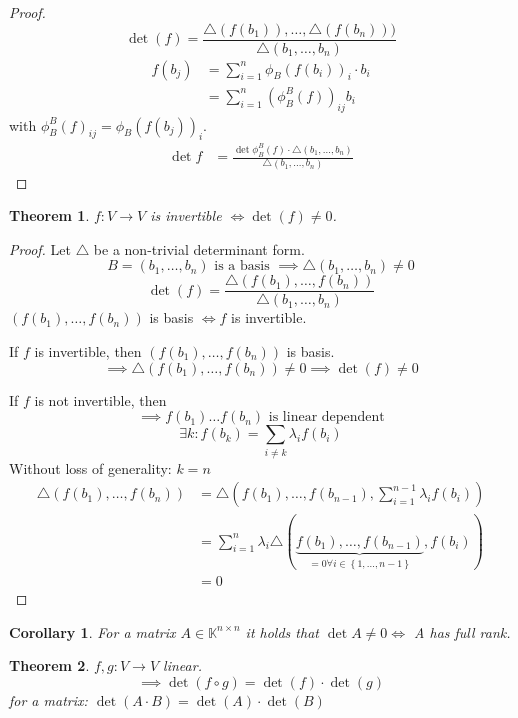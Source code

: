 \documentclass{article}
\newtheorem{theorem}{Theorem}  \numberwithin{theorem}{section}
\newtheorem*{corollary}{Corollary}%
\newcommand{\set}[1]{\left\{#1\right\}}
\begin{document}
\begin{proof}
  \[ \det(f) = \frac{\triangle(f(b_1)), \dots, \triangle(f(b_n)))}{\triangle (b_1, \dots, b_n)} \]
  \begin{align*}
  	f(b_j) &= \sum_{i=1}^n \phi_B(f(b_i))_i \cdot b_i \\
  		   &= \sum_{i=1}^n \left(\phi_B^B(f)\right)_{ij} b_i
  \end{align*}
  with $\phi_B^B(f)_{ij} = \phi_B(f(b_j))_i$.
  \begin{align*}
  	\det{f} &= \frac{\det{\phi_B^B(f) \cdot \triangle(b_1, \dots, b_n)}}{\triangle(b_1, \dots, b_n)}
  \end{align*}
\end{proof}

\begin{theorem} %
  $f: V \to V$ is invertible $\iff \det(f) \neq 0$.
\end{theorem}
\begin{proof}
  Let $\triangle$ be a non-trivial determinant form.
  \[ B = (b_1, \dots, b_n) \text{ is a basis } \implies \triangle(b_1, \dots, b_n) \neq 0 \]
  \[ \det(f) = \frac{\triangle(f(b_1), \dots, f(b_n))}{\triangle(b_1, \dots, b_n)} \]
  $(f(b_1), \dots, f(b_n))$ is basis $\iff f$ is invertible.

  If $f$ is invertible, then $(f(b_1), \dots, f(b_n))$ is basis.
  \[ \implies \triangle (f(b_1), \dots, f(b_n)) \neq 0 \implies \det(f) \neq 0 \]

  If $f$ is not invertible, then
  \[ \implies f(b_1) \dots f(b_n) \text{ is linear dependent} \]
  \[ \exists k: f(b_k) = \sum_{i\neq k} \lambda_i f(b_i) \]
  Without loss of generality: $k = n$
  \begin{align*}
  	\triangle(f(b_1), \dots, f(b_n)) &= \triangle(f(b_1), \dots, f(b_{n-1}), \sum_{i=1}^{n-1} \lambda_i f(b_i)) \\
  		&= \sum_{i=1}^n \lambda_i \triangle(\underbrace{f(b_1), \dots, f(b_{n-1})}_{=0 \forall i \in \set{1,\dots,n-1}}, f(b_i)) \\
  		&= 0
  \end{align*}
\end{proof}

\begin{corollary}
  For a matrix $A \in \mathbb K^{n\times n}$ it holds that $\det{A} \neq 0 \iff$ A has full rank.
\end{corollary}

\begin{theorem} %
  $f, g: V \to V$ linear.
  \[ \implies \det(f \circ g) = \det(f) \cdot \det(g) \]
  for a matrix: $\det(A \cdot B) = \det(A) \cdot \det(B)$
\end{theorem}
\end{document}
